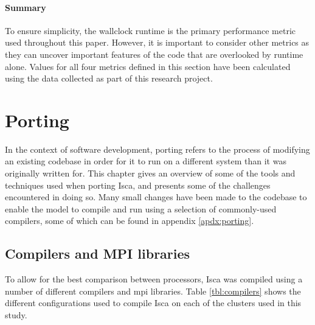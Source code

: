 \documentclass[a4paper,11pt]{report}
\begin{document}
\subsubsection{Summary}
To ensure simplicity, the wallclock runtime is the primary performance metric used throughout this paper. However, it is important to consider other metrics as they can uncover important features of the code that are overlooked by runtime alone. Values for all four metrics defined in this section have been calculated using the data collected as part of this research project. 




\let\textcircled=\pgftextcircled
\chapter{Porting}
\label{chap:baselineexp}
In the context of software development, porting refers to the process of modifying an existing codebase in order for it to run on a different system than it was originally written for. This chapter gives an overview of some of the tools and techniques used when porting Isca, and presents some of the challenges encountered in doing so. Many small changes have been made to the codebase to enable the model to compile and run using a selection of commonly-used compilers, some of which can be found in appendix \ref{apdx:porting}. 

\section{Compilers and MPI libraries}
To allow for the best comparison between processors, Isca was compiled using a number of different compilers and \gls{mpi} libraries. Table \ref{tbl:compilers} shows the different configurations used to compile Isca on each of the clusters used in this study. 
\end{document}
